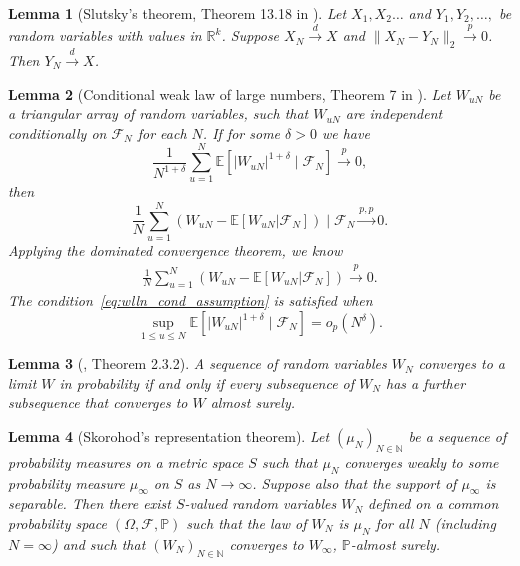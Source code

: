 \documentclass[12pt]{article}
\newtheorem{lemma}{Lemma}
\def\P{\mathbb{P}}
\def\P{\mathbb{P}}
\newcommand{\E}{\mathbb E}								%
\renewcommand{\P}{\mathbb{P}}							%
\newcommand{\convp}{\overset p \rightarrow}             %
\newcommand{\convd}{\overset d \rightarrow}             %
\newcommand{\convpp}{\overset {p,p} \longrightarrow}    %
\begin{document}
\begin{lemma}[Slutsky's theorem, Theorem 13.18 in \citet{Dudley_2002}]\label{lem:Slutsky}
	Let $X_1,X_2\ldots$ and $Y_1,Y_2,\ldots,$ be random variables with values in $\mathbb{R}^{k}$. Suppose $X_N\convd X$ and $\|X_N-Y_N\|_2\convp 0$. Then $Y_N\convd X$.
\end{lemma}






\begin{lemma}[Conditional weak law of large numbers, Theorem 7 in \citet{niu2024reconciling}] \label{lem:wlln_conditional} 
	Let $W_{uN}$ be a triangular array of random variables, such that $W_{uN}$ are independent conditionally on $\mathcal F_N$ for each $N$. If for some $\delta > 0$ we have
	\begin{equation}
		\frac{1}{N^{1+\delta}}\sum_{u=1}^N\E[|W_{uN}|^{1+\delta}\mid\mathcal{F}_N] \convp 0,
		\label{eq:wlln_cond_assumption}
	\end{equation}
	then 
	\begin{equation}
		\frac{1}{N} \sum_{u = 1}^N (W_{uN} - \E[W_{uN}|\mathcal{F}_N]) \mid \mathcal F_N \convpp 0.
		\label{eq:wlln_cond_conclusion}
	\end{equation}
	Applying the dominated convergence theorem, we know 
	\begin{align*}
		\frac{1}{N} \sum_{u = 1}^N (W_{uN} - \E[W_{uN}|\mathcal{F}_N])\convp 0.
	\end{align*}
	The condition~\eqref{eq:wlln_cond_assumption} is satisfied when
	\begin{equation}
		\sup_{1\leq u\leq N}\E[|W_{uN}|^{1+\delta} \mid \mathcal{F}_N]=o_p(N^{\delta}).
		\label{eq:wlln_cond_sufficient}
	\end{equation}
\end{lemma}


\begin{lemma}[\citet{durrett2019probability}, Theorem 2.3.2]\label{lem:sub_subseq}
	A sequence of random variables $W_N$ converges to a limit $W$ in probability if and only if every subsequence of $W_N$ has a further subsequence that converges to $W$ almost surely.
\end{lemma}

\begin{lemma}[Skorohod's representation theorem]\label{lem:skorohod}
	Let \( (\mu_N)_{N \in \mathbb{N}} \) be a sequence of probability measures on a metric space \( S \) such that \( \mu_N \) converges weakly to some probability measure \( \mu_{\infty} \) on \( S \) as \( N\to \infty \). Suppose also that the support of \( \mu_{\infty} \) is separable. Then there exist \( S \)-valued random variables \( W_N \) defined on a common probability space \( (\Omega, \mathcal{F}, \P) \) such that the law of \( W_N \) is \( \mu_N \) for all \( N \) (including \( N = \infty \)) and such that \( (W_N)_{N \in \mathbb{N}} \) converges to \( W_{\infty} \), \( \P \)-almost surely.
\end{lemma}
\end{document}
